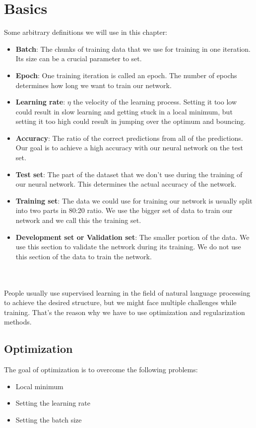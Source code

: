 \section{Basics}
\begin{minipage}{\textwidth}
Some arbitrary definitions we will use in this chapter:
\begin{itemize}
	\item \textbf{Batch}: The chunks of training data that we use for training in one iteration. Its size can be a crucial parameter to set.
	\item \textbf{Epoch}: One training iteration is called an epoch. The number of epochs determines how long we want to train our network.
	\item \textbf{Learning rate}: \(\eta\) the velocity of the learning process. Setting it too low could result in slow learning and getting stuck in a local minimum, but setting it too high could result in jumping over the optimum and bouncing.
	\item \textbf{Accuracy}: The ratio of the correct predictions from all of the predictions. Our goal is to achieve a high accuracy with our neural network on the test set.
	\item \textbf{Test set}: The part of the dataset that we don't use during the training of our neural network. This determines the actual accuracy of the network.
	\item \textbf{Training set}: The data we could use for training our network is usually split into two parts in 80:20 ratio. We use the bigger set of data to train our network and we call this the training set.
	\item \textbf{Development set or Validation set}: The smaller portion of the data. We use this section to validate the network during its training. We do not use this section of the data to train the network.
\end{itemize}
\end{minipage}
\\
\\
People usually use supervised learning in the field of natural language processing to achieve the desired structure, but we might face multiple challenges while training. That's the reason why we have to use optimization and regularization methods.

\subsection{Optimization}
The goal of optimization is to overcome the following problems:
\begin{itemize}
	\item Local minimum
	\item Setting the learning rate
	\item Setting the batch size
\end{itemize}

